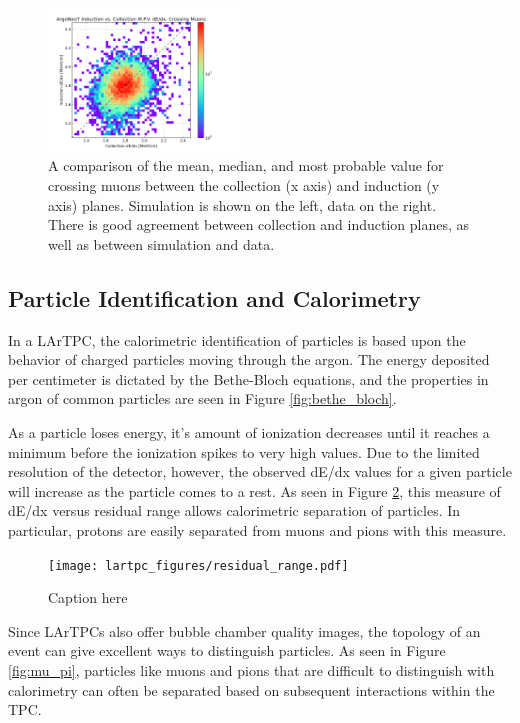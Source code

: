 \begin{figure}[p]
  \includegraphics[width=0.45\textwidth]{lartpc_figures/mpv_coll_vs_ind_data.png}
  \caption[Cross Plane Calibration Checks]{A comparison of the mean, median, and most probable value for crossing muons between the collection (x axis) and induction (y axis) planes.  Simulation is shown on the left, data on the right.  There is good agreement between collection and induction planes, as well as between simulation and data.}
  \label{fig:coll_ind_differences}
\end{figure}

\subsection{Particle Identification and Calorimetry}

In a LArTPC, the calorimetric identification of particles is based upon the behavior of charged particles moving through the argon.  The energy deposited per centimeter is dictated by the Bethe-Bloch equations, and the properties in argon of common particles are seen in Figure \ref{fig:bethe_bloch}.

As a particle loses energy, it's amount of ionization decreases until it reaches a minimum before the ionization spikes to very high values.  Due to the limited resolution of the detector, however, the observed dE/dx values for a given particle will increase as the particle comes to a rest.  As seen in Figure \ref{fig:residual_range}, this measure of dE/dx versus residual range allows calorimetric separation of particles.  In particular, protons are easily separated from muons and pions with this measure.

\begin{figure}[tb]
  \centering
  \texttt{[image: lartpc\_figures/residual\_range.pdf]}
  \caption{Caption here}
  \label{fig:residual_range}
\end{figure}

Since LArTPCs also offer bubble chamber quality images, the topology of an event can give excellent ways to distinguish particles.  As seen in Figure \ref{fig:mu_pi}, particles like muons and pions that are difficult to distinguish with calorimetry can often be separated based on subsequent interactions within the TPC.



